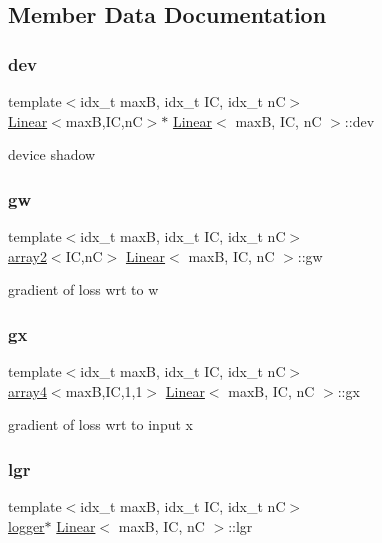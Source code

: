 \subsection{Member Data Documentation}
\mbox{\label{structLinear_a84bf1832fbbaccc87ca3e13b45f5acb4}} 
\subsubsection{\texorpdfstring{dev}{dev}}
{\footnotesize\ttfamily template$<$idx\+\_\+t maxB, idx\+\_\+t IC, idx\+\_\+t nC$>$ \\
\hyperlink{structLinear}{Linear}$<$maxB,IC,nC$>$$\ast$ \hyperlink{structLinear}{Linear}$<$ maxB, IC, nC $>$\+::dev}

device shadow \mbox{\label{structLinear_a62267914d63b5f94379e4f9caf6b317c}} 
\subsubsection{\texorpdfstring{gw}{gw}}
{\footnotesize\ttfamily template$<$idx\+\_\+t maxB, idx\+\_\+t IC, idx\+\_\+t nC$>$ \\
\hyperlink{structarray2}{array2}$<$IC,nC$>$ \hyperlink{structLinear}{Linear}$<$ maxB, IC, nC $>$\+::gw}

gradient of loss wrt to w \mbox{\label{structLinear_abcdbaef350ab7abbcb459cfa87961bba}} 
\subsubsection{\texorpdfstring{gx}{gx}}
{\footnotesize\ttfamily template$<$idx\+\_\+t maxB, idx\+\_\+t IC, idx\+\_\+t nC$>$ \\
\hyperlink{structarray4}{array4}$<$maxB,IC,1,1$>$ \hyperlink{structLinear}{Linear}$<$ maxB, IC, nC $>$\+::gx}

gradient of loss wrt to input x \mbox{\label{structLinear_acde13832b627b3c1113283e22bac77a7}} 
\subsubsection{\texorpdfstring{lgr}{lgr}}
{\footnotesize\ttfamily template$<$idx\+\_\+t maxB, idx\+\_\+t IC, idx\+\_\+t nC$>$ \\
\hyperlink{structlogger}{logger}$\ast$ \hyperlink{structLinear}{Linear}$<$ maxB, IC, nC $>$\+::lgr}

